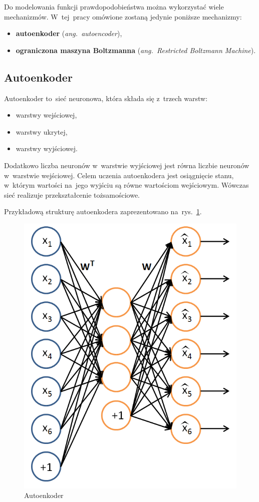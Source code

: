 Do modelowania funkcji prawdopodobieństwa można wykorzystać wiele mechanizmów. W~tej~pracy omówione zostaną
jedynie poniższe mechanizmy:
\begin{itemize}
    \item \textbf{autoenkoder} (\textit{ang.~autoencoder}),
    \item \textbf{ograniczona maszyna Boltzmanna} (\textit{ang.~Restricted Boltzmann Machine}).
\end{itemize}

\subsection{Autoenkoder}
Autoenkoder \cite{Autoencoder} to~sieć neuronowa, która składa się z~trzech warstw:
\begin{itemize}
	\item warstwy wejściowej,
	\item warstwy ukrytej,
	\item warstwy wyjściowej.
\end{itemize}

Dodatkowo liczba neuronów w~warstwie wyjściowej jest równa liczbie neuronów w~warstwie wejściowej.
Celem uczenia autoenkodera jest osiągnięcie stanu, w~którym wartości na~jego wyjściu są równe
wartościom wejściowym. Wówczas sieć realizuje przekształcenie tożsamościowe.

Przykładową strukturę autoenkodera zaprezentowano na~rys.~\ref{rys:autoenkoder}.
\begin{figure}[H]
	\centering
	\includegraphics[width=0.75\linewidth]{img/autoencoder.png}
	\caption{Autoenkoder}
	\label{rys:autoenkoder}
\end{figure}

